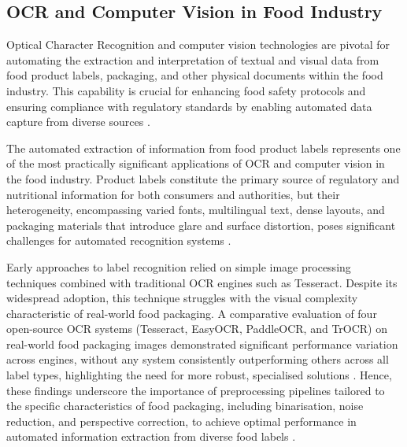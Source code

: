\hypertarget{ocr-and-computer-vision-in-food-industry}{%
\subsection{OCR and Computer Vision in Food Industry}\label{ocr-and-computer-vision-in-food-industry}}

Optical Character Recognition and computer vision technologies are pivotal for automating the extraction and interpretation of textual and visual data from food product labels, packaging, and other physical documents within the food industry. This capability is crucial for enhancing food safety protocols and ensuring compliance with regulatory standards by enabling automated data capture from diverse sources \parencite{marina_arribas_lopez_6d42e82a}.

The automated extraction of information from food product labels represents one of the most practically significant applications of OCR and computer vision in the food industry. Product labels constitute the primary source of regulatory and nutritional information for both consumers and authorities, but their heterogeneity, encompassing varied fonts, multilingual text, dense layouts, and packaging materials that introduce glare and surface distortion, poses significant challenges for automated recognition systems \parencite{v_nia_guimar_es_e2e932db}.

Early approaches to label recognition relied on simple image processing techniques combined with traditional OCR engines such as Tesseract. Despite its widespread adoption, this technique struggles with the visual complexity characteristic of real-world food packaging. A comparative evaluation of four open-source OCR systems (Tesseract, EasyOCR, PaddleOCR, and TrOCR) on real-world food packaging images demonstrated significant performance variation across engines, without any system consistently outperforming others across all label types, highlighting the need for more robust, specialised solutions \parencite{mayimunah_nagayi_62f20413}. Hence, these findings underscore the importance of preprocessing pipelines tailored to the specific characteristics of food packaging, including binarisation, noise reduction, and perspective correction, to achieve optimal performance in automated information extraction from diverse food labels \parencite{mayimunah_nagayi_62f20413}.

